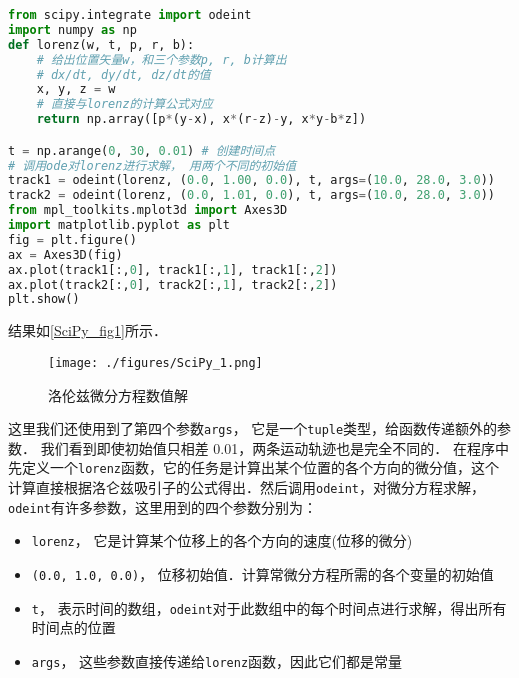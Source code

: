 \begin{lstlisting}[language=python]
from scipy.integrate import odeint
import numpy as np
def lorenz(w, t, p, r, b):
    # 给出位置矢量w，和三个参数p, r, b计算出
    # dx/dt, dy/dt, dz/dt的值
    x, y, z = w
    # 直接与lorenz的计算公式对应
    return np.array([p*(y-x), x*(r-z)-y, x*y-b*z])

t = np.arange(0, 30, 0.01) # 创建时间点
# 调用ode对lorenz进行求解， 用两个不同的初始值
track1 = odeint(lorenz, (0.0, 1.00, 0.0), t, args=(10.0, 28.0, 3.0))
track2 = odeint(lorenz, (0.0, 1.01, 0.0), t, args=(10.0, 28.0, 3.0))
from mpl_toolkits.mplot3d import Axes3D
import matplotlib.pyplot as plt
fig = plt.figure()
ax = Axes3D(fig)
ax.plot(track1[:,0], track1[:,1], track1[:,2])
ax.plot(track2[:,0], track2[:,1], track2[:,2])
plt.show()
\end{lstlisting}
结果如\autoref{SciPy_fig1}所示．
\begin{figure}[ht]
\centering
\texttt{[image: ./figures/SciPy\_1.png]}
\caption{洛伦兹微分方程数值解} \label{SciPy_fig1}
\end{figure}
这里我们还使用到了第四个参数\verb|args|， 它是一个\verb|tuple|类型，给函数传递额外的参数． 我们看到即使初始值只相差 0.01，两条运动轨迹也是完全不同的．
在程序中先定义一个\verb|lorenz|函数，它的任务是计算出某个位置的各个方向的微分值，这个计算直接根据洛仑兹吸引子的公式得出．然后调用\verb|odeint|，对微分方程求解，\verb|odeint|有许多参数，这里用到的四个参数分别为：
\begin{itemize}
\item \verb|lorenz|， 它是计算某个位移上的各个方向的速度(位移的微分)
\item \verb|(0.0, 1.0, 0.0)|， 位移初始值．计算常微分方程所需的各个变量的初始值
\item \verb|t|， 表示时间的数组，\verb|odeint|对于此数组中的每个时间点进行求解，得出所有时间点的位置
\item \verb|args|， 这些参数直接传递给\verb|lorenz|函数，因此它们都是常量
\end{itemize}
